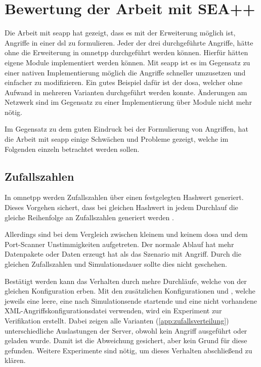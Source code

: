 \section{Bewertung der Arbeit mit SEA++}\label{sec:bewertung}
Die Arbeit mit \gls{seapp} hat gezeigt, dass es mit der Erweiterung möglich ist, Angriffe in einer \gls{dsl} zu formulieren. Jeder der drei durchgeführte Angriffe, hätte ohne die Erweiterung in \gls{omnetpp} durchgeführt werden können. Hierfür hätten eigene Module implementiert werden können. Mit \gls{seapp} ist es im Gegensatz zu einer nativen Implementierung möglich die Angriffe schneller umzusetzen und einfacher zu modifizieren. Ein gutes Beispiel dafür ist der \gls{dosa}, welcher ohne Aufwand in mehreren Varianten durchgeführt werden konnte. Änderungen am Netzwerk sind im Gegensatz zu einer Implementierung über Module nicht mehr nötig.

Im Gegensatz zu dem guten Eindruck bei der Formulierung von Angriffen, hat die Arbeit mit \gls{seapp} einige Schwächen und Probleme gezeigt, welche im Folgenden einzeln betrachtet werden sollen. 

\subsection{Zufallszahlen}\label{aus:Zufallszahlen}
In \gls{omnetpp} werden Zufallszahlen über einen festgelegten Hashwert generiert. Dieses Vorgehen sichert, dass bei gleichen Hashwert in jedem Durchlauf die gleiche Reihenfolge an Zufallszahlen generiert werden \cite[]{OmnetManual}. 

Allerdings sind bei dem Vergleich zwischen kleinem und keinem \gls{dosa} und dem Port-Scanner Unstimmigkeiten aufgetreten. Der normale Ablauf hat mehr Datenpakete oder Daten erzeugt hat als das Szenario mit Angriff. Durch die gleichen Zufallszahlen und Simulationsdauer sollte dies nicht geschehen.

Bestätigt werden kann das Verhalten durch mehre Durchläufe, welche von der gleichen Konfiguration erben. Mit den zusätzlichen Konfigurationen  und , welche jeweils eine leere, eine nach Simulationsende startende und eine nicht vorhandene XML-Angriffskonfigurationsdatei verwenden, wird ein Experiment zur Verifikation erstellt. Dabei zeigen alle Varianten (\ref{app:zufallsverteilung}) unterschiedliche Auslastungen der Server, obwohl kein Angriff ausgeführt oder geladen wurde. Damit ist die Abweichung gesichert, aber kein Grund für diese gefunden. Weitere Experimente sind nötig, um dieses Verhalten abschließend zu klären. 

